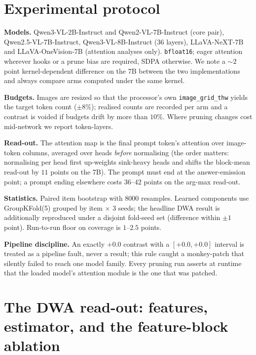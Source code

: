 
\section{Experimental protocol}\label{app:proto}

\textbf{Models.} Qwen3-VL-2B-Instruct and Qwen2-VL-7B-Instruct (core pair), Qwen2.5-VL-7B-Instruct, Qwen3-VL-8B-Instruct
(36 layers), LLaVA-NeXT-7B and LLaVA-OneVision-7B (attention analyses only). \texttt{bfloat16}; eager attention
wherever hooks or a prune bias are required, SDPA otherwise. We note a ${\sim}2$ point kernel-dependent difference on
the 7B between the two implementations and always compare arms computed under the same kernel.

\textbf{Budgets.} Images are resized so that the processor's own \texttt{image\_grid\_thw} yields the target token
count ($\pm 8\%$); realised counts are recorded per arm and a contrast is voided if budgets drift by more than $10\%$.
Where pruning changes cost mid-network we report token-layers.

\textbf{Read-out.} The attention map is the final prompt token's attention over image-token columns, averaged over
heads \emph{before} normalising (the order matters: normalising per head first up-weights sink-heavy heads and shifts
the block-mean read-out by $11$ points on the 7B). The prompt must end at the answer-emission point; a prompt ending
elsewhere costs $36$--$42$ points on the arg-max read-out.

\textbf{Statistics.} Paired item bootstrap with 8000 resamples. Learned components use GroupKFold(5) grouped by item
$\times$ 3 seeds; the headline DWA result is additionally reproduced under a disjoint fold-seed set (difference
within $\pm1$ point). Run-to-run floor on coverage is $1$--$2.5$ points.

\textbf{Pipeline discipline.} An exactly $+0.0$ contrast with a $[+0.0,+0.0]$ interval is treated as a pipeline fault,
never a result; this rule caught a monkey-patch that silently failed to reach one model family. Every pruning run
asserts at runtime that the loaded model's attention module is the one that was patched.

\section{The DWA read-out: features, estimator, and the feature-block ablation}\label{app:feat_engine}

